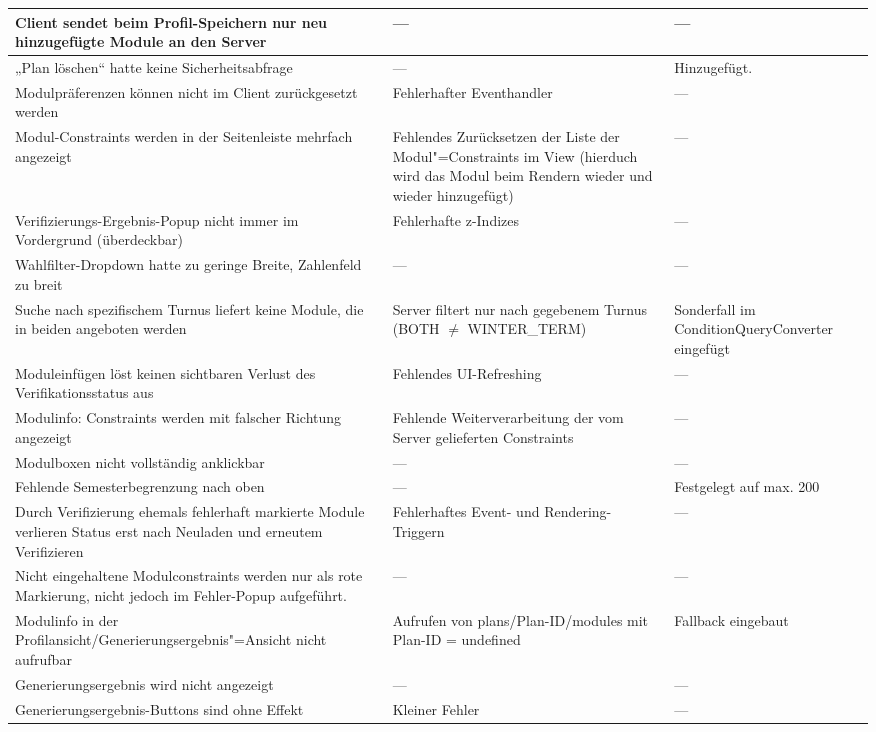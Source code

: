 \begin{longtable}{| >{\hspace{0pt}} p{} | >{\hspace{0pt}} p{} | >{\hspace{0pt}} p{} | }
	\hline
	Client sendet beim Profil-Speichern nur neu hinzugefügte Module an den Server & --- & --- \\
	\hline
	„Plan löschen“ hatte keine Sicherheitsabfrage & --- & Hinzugefügt. \\
	\hline
	Modulpräferenzen können nicht im Client zurückgesetzt werden & Fehlerhafter Eventhandler & --- \\
	\hline
	Modul-Constraints werden in der Seitenleiste mehrfach angezeigt & Fehlendes Zurücksetzen der Liste der Modul"=Constraints im View (hierduch wird das Modul beim Rendern wieder und wieder hinzugefügt) & --- \\
	\hline
	Verifizierungs-Ergebnis-Popup nicht immer im Vordergrund (überdeckbar) & Fehlerhafte z-Indizes & --- \\
	\hline
	Wahlfilter-Dropdown hatte zu geringe Breite, Zahlenfeld zu breit & --- & --- \\
	\hline
	Suche nach spezifischem Turnus liefert keine Module, die in beiden angeboten werden & Server filtert nur nach gegebenem Turnus (BOTH $\neq$ WINTER\_TERM) & Sonderfall im ConditionQueryConverter eingefügt \\
	\hline
	Moduleinfügen löst keinen sichtbaren Verlust des Verifikationsstatus aus & Fehlendes UI-Refreshing & --- \\
	\hline
	Modulinfo: Constraints werden mit falscher Richtung angezeigt & Fehlende Weiterverarbeitung der vom Server gelieferten Constraints & --- \\
	\hline
	Modulboxen nicht vollständig anklickbar & ---  & --- \\
	\hline
	Fehlende Semesterbegrenzung nach oben & --- & Festgelegt auf max. 200 \\
	\hline
	Durch Verifizierung ehemals fehlerhaft markierte Module verlieren Status erst nach Neuladen und erneutem Verifizieren & Fehlerhaftes Event- und Rendering-Triggern & --- \\
	\hline
	Nicht eingehaltene Modulconstraints werden nur als rote Markierung, nicht jedoch im Fehler-Popup aufgeführt. & --- & --- \\
	\hline
	Modulinfo in der Profilansicht/Generierungsergebnis"=Ansicht nicht aufrufbar & Aufrufen von plans/Plan-ID/modules mit Plan-ID = undefined & Fallback eingebaut \\
	\hline
	Generierungsergebnis wird nicht angezeigt & ---  & --- \\
	\hline
	Generierungsergebnis-Buttons sind ohne Effekt & Kleiner Fehler  & --- \\

\end{longtable}
